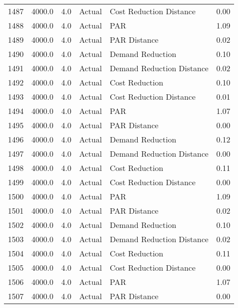 \begin{longtable}{lrrllr}
1487 &       4000.0 &     4.0 &         Actual &    Cost Reduction Distance &   0.00 \\
1488 &       4000.0 &     4.0 &         Actual &                        PAR &   1.09 \\
1489 &       4000.0 &     4.0 &         Actual &               PAR Distance &   0.02 \\
1490 &       4000.0 &     4.0 &         Actual &           Demand Reduction &   0.10 \\
1491 &       4000.0 &     4.0 &         Actual &  Demand Reduction Distance &   0.02 \\
1492 &       4000.0 &     4.0 &         Actual &             Cost Reduction &   0.10 \\
1493 &       4000.0 &     4.0 &         Actual &    Cost Reduction Distance &   0.01 \\
1494 &       4000.0 &     4.0 &         Actual &                        PAR &   1.07 \\
1495 &       4000.0 &     4.0 &         Actual &               PAR Distance &   0.00 \\
1496 &       4000.0 &     4.0 &         Actual &           Demand Reduction &   0.12 \\
1497 &       4000.0 &     4.0 &         Actual &  Demand Reduction Distance &   0.00 \\
1498 &       4000.0 &     4.0 &         Actual &             Cost Reduction &   0.11 \\
1499 &       4000.0 &     4.0 &         Actual &    Cost Reduction Distance &   0.00 \\
1500 &       4000.0 &     4.0 &         Actual &                        PAR &   1.09 \\
1501 &       4000.0 &     4.0 &         Actual &               PAR Distance &   0.02 \\
1502 &       4000.0 &     4.0 &         Actual &           Demand Reduction &   0.10 \\
1503 &       4000.0 &     4.0 &         Actual &  Demand Reduction Distance &   0.02 \\
1504 &       4000.0 &     4.0 &         Actual &             Cost Reduction &   0.11 \\
1505 &       4000.0 &     4.0 &         Actual &    Cost Reduction Distance &   0.00 \\
1506 &       4000.0 &     4.0 &         Actual &                        PAR &   1.07 \\
1507 &       4000.0 &     4.0 &         Actual &               PAR Distance &   0.00 \\

\end{longtable}
